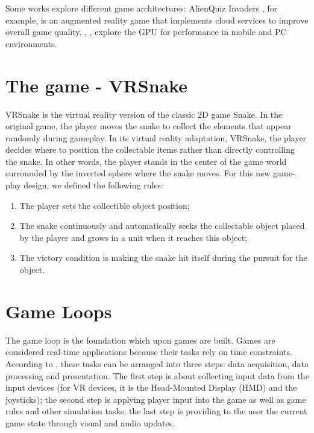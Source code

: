 \documentclass[runningheads]{llncs}
\begin{document}
Some works explore different game architectures: AlienQuiz Invaders \cite{Loop2012}, for example, is an augmented reality game that implements cloud services to improve overall game quality. \cite{MobileWars}, \cite{joselli2009gpuwars}, \cite{GameArchitecture2009} explore the GPU for performance in mobile and PC environments.




\section{The game - VRSnake} \label{sec:vrsnake}
VRSnake is the virtual reality version of the classic 2D game Snake.
In the original game, the player moves the snake to collect the elements that appear randomly during gameplay. In its virtual reality adaptation, VRSnake, the player decides where to position the collectable items rather than directly controlling the snake. In other words, the player stands in the center of the game world surrounded by the inverted sphere where the snake moves.
For this new game-play design, we defined the following rules:

\begin{enumerate}
\item The player sets the collectible object position;
\item The snake continuously and automatically seeks the collectable object placed by the player and grows in a unit when it reaches this object;
\item The victory condition is making the snake hit itself during the pursuit for the object.
\end{enumerate}

\section{Game Loops} \label{sec:game-loops}
The game loop is the foundation which upon games are built. Games are considered real-time applications because their tasks rely on time constraints. According to \cite{GameArchitecture2009}, these tasks can be arranged into three steps: data acquisition, data processing and presentation. The first step is about collecting input data from the input devices (for VR devices, it is the Head-Mounted Display (HMD) and the joysticks); the second step is applying player input into the game as well as game rules and other simulation tasks; the last step is providing to the user the current game state through visual and audio updates.
\end{document}
